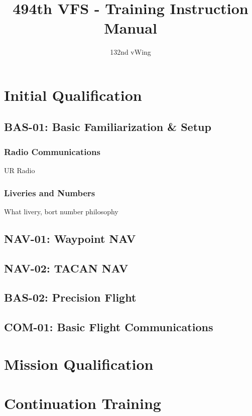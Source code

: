 \documentclass[11pt,a4paper]{report}
\author{132nd vWing}
\title{494th VFS - Training Instruction Manual}
\begin{document}
  
  

  \tableofcontents
    \newpage
    
  \part{Initial Qualification}
    \chapter{BAS-01: Basic Familiarization \& Setup}
      \section{Radio Communications}
        UR Radio

      \section{Liveries and Numbers}
        What livery, bort number philosophy

    
    \chapter{NAV-01: Waypoint NAV}
    \chapter{NAV-02: TACAN NAV}
    \chapter{BAS-02: Precision Flight}
    \chapter{COM-01: Basic Flight Communications}

  \part{Mission Qualification}

  \part{Continuation Training}

  
\end{document}
